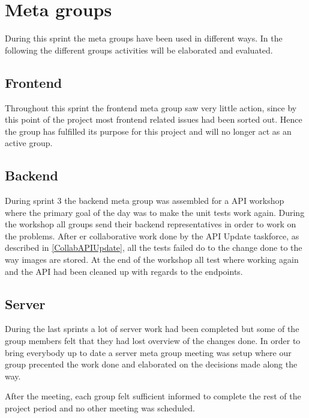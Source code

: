 \section{Meta groups}
During this sprint the meta groups have been used in different ways. 
In the following the different groups activities will be elaborated and evaluated.

\subsection{Frontend}
Throughout this sprint the frontend meta group saw very little action, since by this point of the project most frontend related issues had been sorted out. 
Hence the group has fulfilled its purpose for this project and will no longer act as an active group.

\subsection{Backend}
During sprint 3 the backend meta group was assembled for a API workshop where the primary goal of the day was to make the unit tests work again.
During the workshop all groups send their backend representatives in order to work on the problems.
After er collaborative work done by the API Update taskforce, as described in \autoref{CollabAPIUpdate}, all the tests failed do to the change done to the way images are stored. 
At the end of the workshop all test where working again and the API had been cleaned up with regards to the endpoints. 

\subsection{Server}
During the last sprints a lot of server work had been completed but some of the group members felt that they had lost overview of the changes done. 
In order to bring everybody up to date a server meta group meeting was setup where our group precented the work done and elaborated on the decisions made along the way. 

After the meeting, each group felt sufficient informed to complete the rest of the project period and no other meeting was scheduled.
